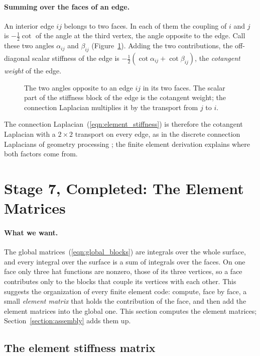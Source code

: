 \paragraph{Summing over the faces of an edge.} An interior edge $ij$ belongs to two faces. In each of them the coupling of $i$ and $j$ is $-\frac12\cot$ of the angle at the third vertex, the angle opposite to the edge. Call these two angles $\alpha_{ij}$ and $\beta_{ij}$ (Figure~\ref{fig:cotangent}). Adding the two contributions, the off-diagonal scalar stiffness of the edge is $-\frac12 (\cot \alpha_{ij} + \cot \beta_{ij})$, the \emph{cotangent weight} of the edge.
\begin{figure}[t]
\centering
{}
\caption{The two angles opposite to an edge $ij$ in its two faces. The scalar part of the stiffness block of the edge is the cotangent weight; the connection Laplacian multiplies it by the transport from $j$ to $i$.}
\label{fig:cotangent}
\end{figure}
The connection Laplacian~(\ref{eqn:element_stiffness}) is therefore the cotangent Laplacian with a $2 \times 2$ transport on every edge, as in the discrete connection Laplacians of geometry processing \cite{Knoppel2013, Sharp2019}; the finite element derivation explains where both factors come from.

\section{Stage 7, Completed: The Element Matrices}
\label{section:element}

\paragraph{What we want.} The global matrices~(\ref{eqn:global_blocks}) are integrals over the whole surface, and every integral over the surface is a sum of integrals over the faces. On one face only three hat functions are nonzero, those of its three vertices, so a face contributes only to the blocks that couple its vertices with each other. This suggests the organization of every finite element code: compute, face by face, a small \emph{element matrix} that holds the contribution of the face, and then add the element matrices into the global one. This section computes the element matrices; Section~\ref{section:assembly} adds them up.

\subsection{The element stiffness matrix}

